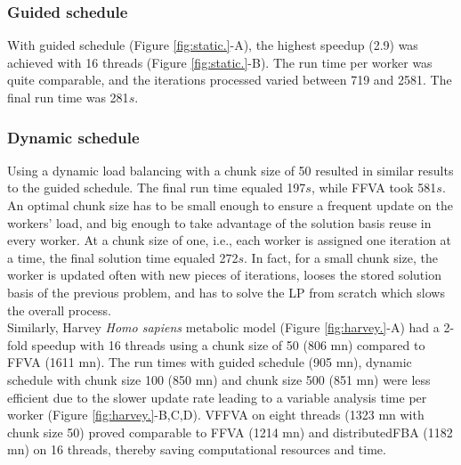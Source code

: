 \subsubsection*{Guided schedule}
With guided schedule (Figure \ref{fig:static.}-A), the highest speedup (2.9) was achieved with 16 threads (Figure \ref{fig:static.}-B). The run time per worker was quite comparable, and the iterations processed varied between 719 and 2581. The final run time was 281$s$.
\subsubsection*{Dynamic schedule}
Using a dynamic load balancing with a chunk size of 50 resulted in similar results to the guided schedule. The final run time equaled 197$s$, while FFVA took 581$s$. An optimal chunk size has to be small enough to ensure a frequent update on the workers' load, and big enough to take advantage of the solution basis reuse in every worker. At a chunk size of one, i.e., each worker is assigned one iteration at a time, the final solution time equaled 272$s$. In fact, for a small chunk size, the worker is updated often with new pieces of iterations, looses the stored solution basis of the previous problem, and has to solve the LP from scratch which slows the overall process.\\ 

\noindent Similarly, Harvey \textit{Homo sapiens} metabolic model \cite{thiele2018metabolism} (Figure \ref{fig:harvey.}-A) had a 2-fold speedup with 16 threads using a chunk size of 50 (806 mn) compared to FFVA (1611 mn). The run times with guided schedule (905 mn), dynamic schedule with chunk size 100 (850 mn) and chunk size 500 (851 mn) were less efficient due to the slower update rate leading to a variable analysis time per worker (Figure \ref{fig:harvey.}-B,C,D). VFFVA on eight threads (1323 mn with chunk size 50) proved comparable to FFVA (1214 mn) and distributedFBA (1182 mn) on 16 threads, thereby saving computational resources and time. 
